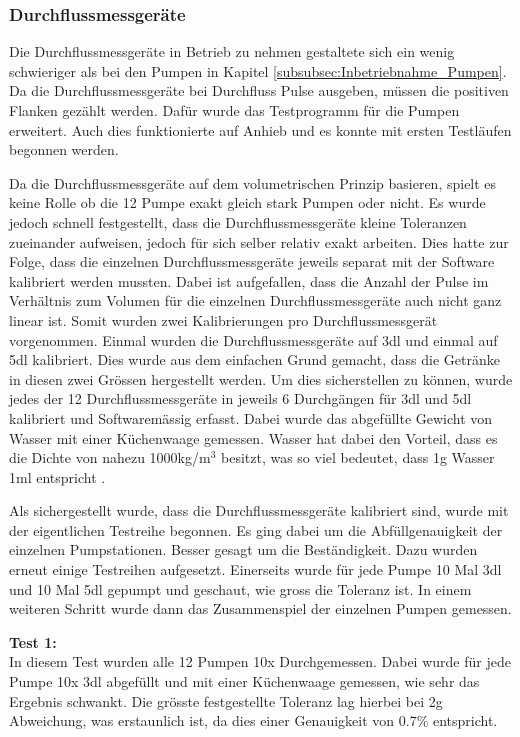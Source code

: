 \subsubsection{Durchflussmessgeräte}
\label{subsubsec:Inbetriebnahme_Durchflussmessgeräte}

Die Durchflussmessgeräte in Betrieb zu nehmen gestaltete sich ein wenig schwieriger als bei den Pumpen in Kapitel \ref{subsubsec:Inbetriebnahme_Pumpen}. Da die Durchflussmessgeräte bei Durchfluss Pulse ausgeben, müssen die positiven Flanken gezählt werden. Dafür wurde das Testprogramm für die Pumpen erweitert. Auch dies funktionierte auf Anhieb und es konnte mit ersten Testläufen begonnen werden. 

Da die Durchflussmessgeräte auf dem volumetrischen Prinzip basieren, spielt es keine Rolle ob die 12 Pumpe exakt gleich stark Pumpen oder nicht. Es wurde jedoch schnell festgestellt, dass die Durchflussmessgeräte kleine Toleranzen zueinander aufweisen, jedoch für sich selber relativ exakt arbeiten. Dies hatte zur Folge, dass die einzelnen Durchflussmessgeräte jeweils separat mit der Software kalibriert werden mussten. Dabei ist aufgefallen, dass die Anzahl der Pulse im Verhältnis zum Volumen für die einzelnen Durchflussmessgeräte auch nicht ganz linear ist. Somit wurden zwei Kalibrierungen pro Durchflussmessgerät vorgenommen. Einmal wurden die Durchflussmessgeräte auf 3dl und einmal auf 5dl kalibriert. Dies wurde aus dem einfachen Grund gemacht, dass die Getränke in diesen zwei Grössen hergestellt werden. Um dies sicherstellen zu können, wurde jedes der 12 Durchflussmessgeräte in jeweils 6 Durchgängen für 3dl und 5dl kalibriert und Softwaremässig erfasst. Dabei wurde das abgefüllte Gewicht von Wasser mit einer Küchenwaage gemessen. Wasser hat dabei den Vorteil, dass es die Dichte von nahezu 1000kg/m$^3$ besitzt, was so viel bedeutet, dass 1g Wasser 1ml entspricht \cite{wagner_iapws_2002}.


Als sichergestellt wurde, dass die Durchflussmessgeräte kalibriert sind, wurde mit der eigentlichen Testreihe begonnen. Es ging dabei um die Abfüllgenauigkeit der einzelnen Pumpstationen. Besser gesagt um die Beständigkeit. Dazu wurden erneut einige Testreihen aufgesetzt. Einerseits wurde für jede Pumpe 10 Mal 3dl und 10 Mal 5dl gepumpt und geschaut, wie gross die Toleranz ist. In einem weiteren Schritt wurde dann das Zusammenspiel der einzelnen Pumpen gemessen. 

\textbf{Test 1:} \\
In diesem Test wurden alle 12 Pumpen 10x Durchgemessen. Dabei wurde für jede Pumpe 10x 3dl abgefüllt und mit einer Küchenwaage gemessen, wie sehr das Ergebnis schwankt. Die grösste festgestellte Toleranz lag hierbei bei 2g Abweichung, was erstaunlich ist, da dies einer Genauigkeit von 0.7\% entspricht.


